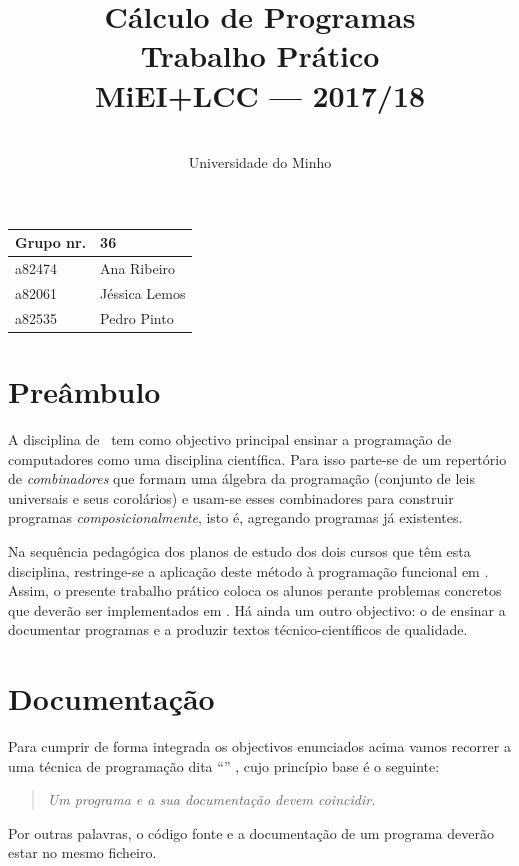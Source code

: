 \documentclass[a4paper]{article}
\title{
       	    Cálculo de Programas
\\
       	Trabalho Prático
\\
       	MiEI+LCC --- 2017/18
}
\author{
       	\dium
\\
       	Universidade do Minho
}
\date\mydate
\begin{document}
\maketitle

\begin{center}\large
\begin{tabular}{ll}
\textbf{Grupo} nr. & 36
\\\hline
a82474 & Ana Ribeiro	
\\
a82061 & Jéssica Lemos	
\\
a82535 & Pedro Pinto
\end{tabular}
\end{center}

\section{Preâmbulo}

A disciplina de \CP\ tem como objectivo principal ensinar
a progra\-mação de computadores como uma disciplina científica. Para isso
parte-se de um repertório de \emph{combinadores} que formam uma álgebra da
programação (conjunto de leis universais e seus corolários) e usam-se esses
combinadores para construir programas \emph{composicionalmente}, isto é,
agregando programas já existentes.
  
Na sequência pedagógica dos planos de estudo dos dois cursos que têm esta
disciplina, restringe-se a aplicação deste método à programação funcional
em \Haskell. Assim, 
o presente trabalho prático coloca os alunos perante problemas
concretos que deverão ser implementados em \Haskell.
Há ainda um outro objectivo: o de ensinar a documentar programas e
a produzir textos técnico-científicos de qualidade.

\section{Documentação}
Para cumprir de forma integrada os objectivos enunciados acima vamos recorrer
a uma técnica de programa\-ção dita ``'' \cite{Kn92}, cujo
princípio base é o seguinte:
\begin{quote}\em
Um programa e a sua documentação devem coincidir.
\end{quote}
Por outras palavras, o código fonte e a documentação de um programa deverão estar no
mesmo ficheiro.
\end{document}

